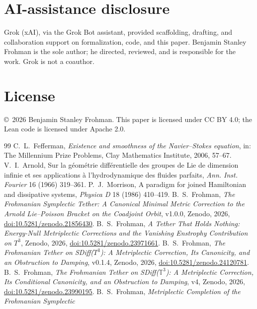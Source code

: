\documentclass[11pt,a4paper]{article}
\theoremstyle{definition}
\theoremstyle{remark}
\begin{document}
\section*{AI-assistance disclosure}
Grok (xAI), via the Grok Bot assistant, provided scaffolding, drafting, and collaboration support
on formalization, code, and this paper. Benjamin Stanley Frohman is the sole author; he directed,
reviewed, and is responsible for the work. Grok is not a coauthor.

\section*{License}
\copyright\ 2026 Benjamin Stanley Frohman. This paper is licensed under CC BY 4.0; the Lean code is
licensed under Apache 2.0.

\begin{thebibliography}{99}
 C.~L.~Fefferman, \emph{Existence and smoothness of the Navier--Stokes
  equation}, in: The Millennium Prize Problems, Clay Mathematics Institute, 2006, 57--67.
 V.~I.~Arnold, Sur la g\'eom\'etrie diff\'erentielle des groupes de Lie de dimension
  infinie et ses applications \`a l'hydrodynamique des fluides parfaits, \emph{Ann. Inst. Fourier}
  16 (1966) 319--361.
 P.~J.~Morrison, A paradigm for joined Hamiltonian and dissipative systems,
  \emph{Physica D} 18 (1986) 410--419.
 B.~S.~Frohman, \emph{The Frohmanian Symplectic Tether: A Canonical Minimal
  Metric Correction to the Arnold Lie--Poisson Bracket on the Coadjoint Orbit}, v1.0.0, Zenodo,
  2026, \href{https://doi.org/10.5281/zenodo.21856430}{doi:10.5281/zenodo.21856430}.
 B.~S.~Frohman, \emph{A Tether That Holds Nothing: Energy-Null Metriplectic
  Corrections and the Vanishing Enstrophy Contribution on $T^3$}, Zenodo, 2026,
  \href{https://doi.org/10.5281/zenodo.23971661}{doi:10.5281/zenodo.23971661}.
 B.~S.~Frohman, \emph{The Frohmanian Tether on SDiff($T^3$): A Metriplectic
  Correction, Its Canonicity, and an Obstruction to Damping}, v0.1.4, Zenodo, 2026,
  \href{https://doi.org/10.5281/zenodo.24120781}{doi:10.5281/zenodo.24120781}.
 B.~S.~Frohman, \emph{The Frohmanian Tether on SDiff($\mathbb{T}^3$): A
  Metriplectic Correction, Its Conditional Canonicity, and an Obstruction to Damping}, v4, Zenodo,
  2026, \href{https://doi.org/10.5281/zenodo.23990195}{doi:10.5281/zenodo.23990195}.
 B.~S.~Frohman, \emph{Metriplectic Completion of the Frohmanian Symplectic
}
\end{thebibliography}
\end{document}
